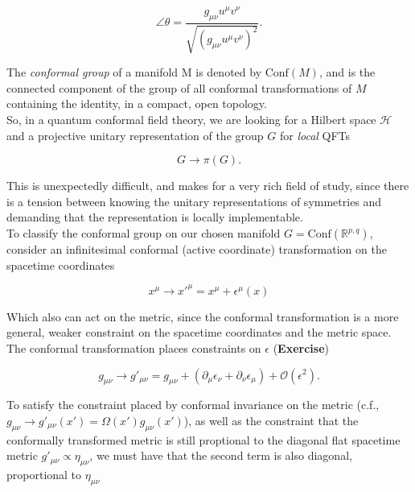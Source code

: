 \begin{equation}
\angle \theta = \frac{g_{\mu\nu} u^\mu v^\nu}{\sqrt{(g_{\mu\nu} u^\mu v^\nu)^2}}.
\end{equation}

\noindent The \textit{conformal group} of a manifold M is denoted by $\text{Conf}(M)$, and is the connected component of the group of all conformal transformations of $M$ containing the identity, in a compact, open topology. \\

\noindent So, in a quantum conformal field theory, we are looking for a Hilbert space $\mathcal{H}$ and a projective unitary representation of the group $G$ for \textit{local} QFTs

\begin{equation}
G \rightarrow \pi (G).
\end{equation}

\noindent This is unexpectedly difficult, and makes for a very rich field of study, since there is a tension between knowing the unitary representations of symmetries and demanding that the representation is locally implementable. \\

\noindent To classify the conformal group on our chosen manifold $G = \text{Conf} (\mathbb{R}^{p,q})$, consider an infinitesimal conformal (active coordinate) transformation on the spacetime coordinates

\begin{equation}
x^\mu \rightarrow x'^\mu = x^\mu +  \epsilon^\mu (x)
\end{equation}

\noindent Which also can act on the metric, since the conformal transformation is a more general, weaker constraint on the spacetime coordinates and the metric space. \\

\noindent The conformal transformation places constraints on $\epsilon$ (\textbf{Exercise})

\begin{equation}
g_{\mu\nu} \rightarrow g'_{\mu\nu} = g_{\mu\nu} + (\partial_\mu \epsilon_\nu + \partial_\nu \epsilon_\mu) + \mathcal{O} (\epsilon^2).
\end{equation}

\noindent To satisfy the constraint placed by conformal invariance on the metric (c.f., $g_{\mu\nu} \rightarrow g'_{\mu\nu} (x') = \Omega(x') g_{\mu\nu} (x')$), as well as the constraint that the conformally transformed metric is still proptional to the diagonal flat spacetime metric $g'_{\mu\nu} \propto \eta_{\mu\nu}$, we must have that the second term is also diagonal, proportional to $\eta_{\mu\nu}$

